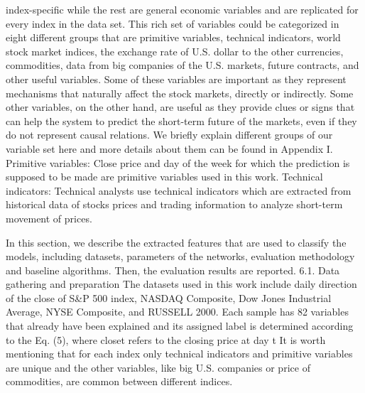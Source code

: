 index-specific while the rest are general economic variables and
are replicated for every index in the data set. This rich set of variables could be categorized in eight different groups that are primitive variables, technical indicators, world stock market indices, the
exchange rate of U.S. dollar to the other currencies, commodities,
data from big companies of the U.S. markets, future contracts, and
other useful variables. Some of these variables are important as
they represent mechanisms that naturally affect the stock markets,
directly or indirectly. Some other variables, on the other hand, are
useful as they provide clues or signs that can help the system to
predict the short-term future of the markets, even if they do not
represent causal relations. We briefly explain different groups of
our variable set here and more details about them can be found in
Appendix I.
Primitive variables: Close price and day of the week for which
the prediction is supposed to be made are primitive variables used
in this work.
Technical indicators: Technical analysts use technical indicators
which are extracted from historical data of stocks prices and trading information to analyze short-term movement of prices.




In this section, we describe the extracted features that are used to classify the models, including datasets, parameters of the networks,
evaluation methodology and baseline algorithms. Then, the evaluation results are reported.
6.1. Data gathering and preparation
The datasets used in this work include daily direction of the
close of S&P 500 index, NASDAQ Composite, Dow Jones Industrial
Average, NYSE Composite, and RUSSELL 2000. Each sample has 82
variables that already have been explained and its assigned label
is determined according to the Eq. (5), where closet refers to the
closing price at day t It is worth mentioning that for each index
only technical indicators and primitive variables are unique and
the other variables, like big U.S. companies or price of commodities, are common between different indices.